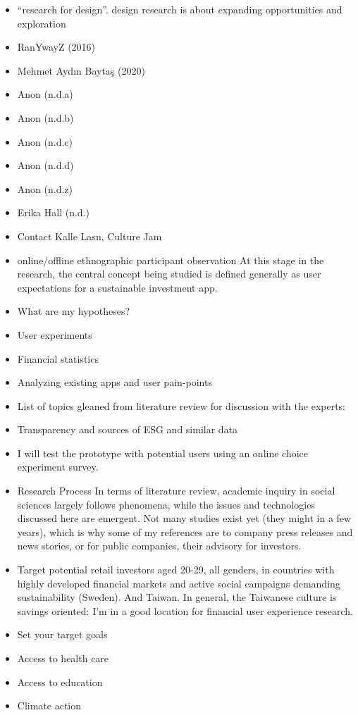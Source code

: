 \documentclass[
  letterpaper,
  DIV=11,
  numbers=noendperiod]{scrartcl}
\begin{document}
\begin{itemize}
\item
  ``research for design''. design research is about expanding
  opportunities and exploration
\item
  RanYwayZ (2016)
\item
  Mehmet Aydın Baytaş (2020)
\item
  Anon (n.d.a)
\item
  Anon (n.d.b)
\item
  Anon (n.d.c)
\item
  Anon (n.d.d)
\item
  Anon (n.d.z)
\item
  Erika Hall (n.d.)
\item
  Contact Kalle Lasn, Culture Jam
\item
  online/offline ethnographic participant observation At this stage in
  the research, the central concept being studied is defined generally
  as user expectations for a sustainable investment app.
\item
  What are my hypotheses?
\item
  User experiments
\item
  Financial statistics
\item
  Analyzing existing apps and user pain-points
\item
  List of topics gleaned from literature review for discussion with the
  experts:
\item
  Transparency and sources of ESG and similar data
\item
  I will test the prototype with potential users using an online choice
  experiment survey.
\item
  Research Process In terms of literature review, academic inquiry in
  social sciences largely follows phenomena, while the issues and
  technologies discussed here are emergent. Not many studies exist yet
  (they might in a few years), which is why some of my references are to
  company press releases and news stories, or for public companies,
  their advisory for investors.
\item
  Target potential retail investors aged 20-29, all genders, in
  countries with highly developed financial markets and active social
  campaigns demanding sustainability (Sweden). And Taiwan. In general,
  the Taiwanese culture is savings oriented: I'm in a good location for
  financial user experience research.
\item
  Set your target goals
\item
  Access to health care
\item
  Access to education
\item
  Climate action
\end{itemize}
\end{document}
